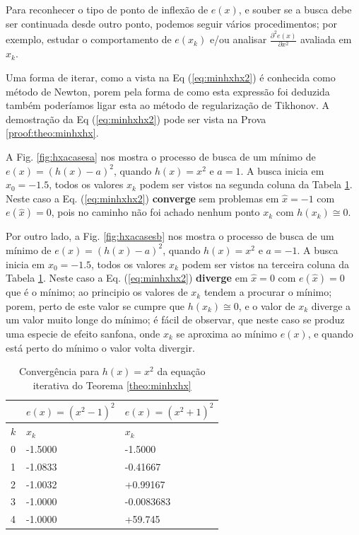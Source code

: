 \begin{theorem}
Para reconhecer o tipo de ponto de inflexão de $e(x)$, e souber se 
a busca debe ser continuada desde outro ponto, 
podemos seguir vários procedimentos; por exemplo, estudar o comportamento 
de $e(x_k)$ e/ou analisar  $\frac{\partial^2 e(x)}{\partial x^2}$ avaliada em $x_k$.

Uma forma de iterar, como a vista na Eq (\ref{eq:minhxhx2}) é conhecida como método de Newton,
porem pela forma de como esta expressão foi deduzida também poderíamos ligar esta ao
método de regularização de Tikhonov.
A demostração da Eq (\ref{eq:minhxhx2}) pode ser vista na Prova \ref{proof:theo:minhxhx}.
\end{theorem}



\begin{example}\label{ex:minhxhx}
 A Fig. \ref{fig:hxacasesa} nos mostra o processo de busca de um mínimo
 de $e(x)=(h(x)-a)^2$, quando $h(x)=x^2$ e $a=1$. A busca inicia em $x_0=-1.5$,
 todos os valores $x_{k}$ podem ser vistos na segunda coluna da
Tabela \ref{tab:hxacases}. Neste caso a Eq. (\ref{eq:minhxhx2}) \textbf{converge} sem problemas em $\hat{x}=-1$ com $e(\hat{x})=0$,
 pois no caminho não foi achado nenhum ponto $x_{k}$ com $h(x_{k})\cong 0$.

 Por outro lado, a Fig. \ref{fig:hxacasesb} nos mostra o processo de busca de um mínimo
 de $e(x)=(h(x)-a)^2$, quando $h(x)=x^2$ e $a=-1$. A busca inicia em $x_0=-1.5$,
 todos os valores $x_{k}$ podem ser vistos na terceira coluna da
Tabela \ref{tab:hxacases}. Neste caso a Eq. (\ref{eq:minhxhx2}) \textbf{diverge} 
em $\hat{x}=0$ com $e(\hat{x})=0$ que é o mínimo;
ao principio os valores de $x_{k}$ tendem a procurar o mínimo; porem,
perto de este valor se cumpre que $h(x_{k})\cong 0$, e o valor de $x_{k}$ diverge
a um valor muito longe do mínimo; é fácil de observar, que neste caso se produz 
uma especie de efeito sanfona, onde $x_{k}$ se aproxima ao mínimo $e(x)$, e quando 
está perto do mínimo o valor volta divergir.

\end{example}

\begin{table}[!h]
\centering
\begin{tabular}{|l|l|l|}
\hline
~&$e(x)=(x^2-1)^2$ & $e(x)=(x^2+1)^2$ \\ \hline
$k$&$x_k$  & $x_k$ \\ \hline
0&-1.5000  & -1.5000      \\
1&-1.0833  & -0.41667     \\
2&-1.0032  & +0.99167     \\
3&-1.0000  & -0.0083683   \\
4&-1.0000  & +59.745      \\  \hline
\end{tabular}
\caption{Convergência para $h(x)=x^2$ da equação iterativa do Teorema \ref{theo:minhxhx}}
\label{tab:hxacases}
\end{table}

